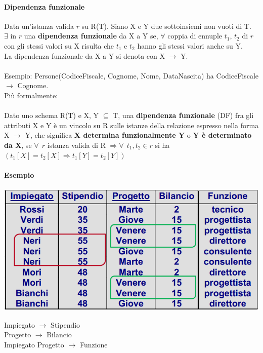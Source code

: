 \documentclass[10pt]{book}
\begin{document}
\paragraph{Dipendenza funzionale} Data un'istanza valida $r$ su R(T). Siano X e Y due sottoinsiemi non vuoti di T.\\
$\exists$ in $r$ una \textbf{dipendenza funzionale} da X a Y se, $\forall$ coppia di ennuple $t_1$, $t_2$ di $r$ con gli stessi valori su X risulta che $t_1$ e $t_2$ hanno gli stessi valori anche su Y.\\
La dipendenza funzionale da X a Y si denota con X $\rightarrow$ Y.\\\\
Esempio: Persone(CodiceFiscale, Cognome, Nome, DataNascita) ha CodiceFiscale $\rightarrow$ Cognome.\\
Più formalmente:\\\\
Dato uno schema R(T) e X, Y $\subseteq$ T, una \textbf{dipendenza funzionale} (DF) fra gli attributi X e Y è un vincolo su R sulle istanze della relazione espresso nella forma X $\rightarrow$ Y, che significa \textbf{X determina funzionalmente Y} o \textbf{Y è determinato da X}, se $\forall\:\:r$ istanza valida di R $\Rightarrow \forall\:\:t_1,t_2\in r$ si ha $(t_1[X] = t_2[X] \Rightarrow t_1[Y] = t_2[Y])$
\paragraph{Esempio}
\begin{center}
	\includegraphics[scale=0.5]{ridondanze.png}
\end{center}
Impiegato $\rightarrow$ Stipendio\\
Progetto $\rightarrow$ Bilancio\\
Impiegato Progetto $\rightarrow$ Funzione
\end{document}
